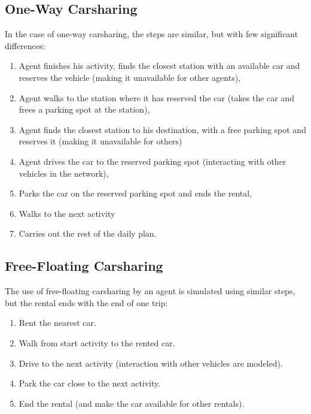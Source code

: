 \subsection{One-Way Carsharing}
In the case of one-way carsharing, the steps are similar, but with few significant differences:
\begin{enumerate}
	\item Agent finishes his activity, finds the closest station with an available car and reserves the vehicle (making it unavailable for other agents),
	\item Agent walks to the station where it has reserved the car (takes the car and frees a parking spot at the station),
	\item Agent finds the closest station to his destination, with a free parking spot and reserves it (making it unavailable for others)
	\item Agent drives the car to the reserved parking spot (interacting with other vehicles in the network),
	\item Parks the car on the reserved parking spot and ends the rental,
	\item Walks to the next activity
	\item Carries out the rest of the daily plan.
\end{enumerate}

\subsection{Free-Floating Carsharing}
The use of free-floating carsharing by an agent is simulated using similar steps, but the rental ends with the end of one trip:
\begin{enumerate}
	\item Rent the nearest car.
	\item	Walk from start activity to the rented car.
	\item	Drive to the next activity (interaction with other vehicles are modeled).
	\item	Park the car close to the next activity.
	\item	End the rental (and make the car available for other rentals).
\end{enumerate}

